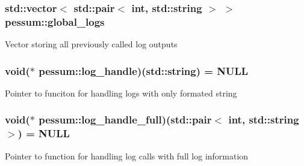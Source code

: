 \subsubsection[{\texorpdfstring{global\+\_\+logs}{global_logs}}]{\setlength{\rightskip}{0pt plus 5cm}std\+::vector$<$ std\+::pair$<$ int, std\+::string $>$ $>$ pessum\+::global\+\_\+logs}\hypertarget{namespacepessum_af89cb9c0ecf053bd93b6cfadf606b350}{}\label{namespacepessum_af89cb9c0ecf053bd93b6cfadf606b350}
Vector storing all previously called log outputs 
\subsubsection[{\texorpdfstring{log\+\_\+handle}{log_handle}}]{\setlength{\rightskip}{0pt plus 5cm}void($\ast$ pessum\+::log\+\_\+handle)(std\+::string) = N\+U\+LL}\hypertarget{namespacepessum_af96bc8aacecc5a8145c0df704b5f9b54}{}\label{namespacepessum_af96bc8aacecc5a8145c0df704b5f9b54}
Pointer to funciton for handling logs with only formated string 
\subsubsection[{\texorpdfstring{log\+\_\+handle\+\_\+full}{log_handle_full}}]{\setlength{\rightskip}{0pt plus 5cm}void($\ast$ pessum\+::log\+\_\+handle\+\_\+full)(std\+::pair$<$ int, std\+::string $>$) = N\+U\+LL}\hypertarget{namespacepessum_abf1b472e1b61a337c584d96eb9789f8e}{}\label{namespacepessum_abf1b472e1b61a337c584d96eb9789f8e}
Pointer to function for handling log calls with full log information 